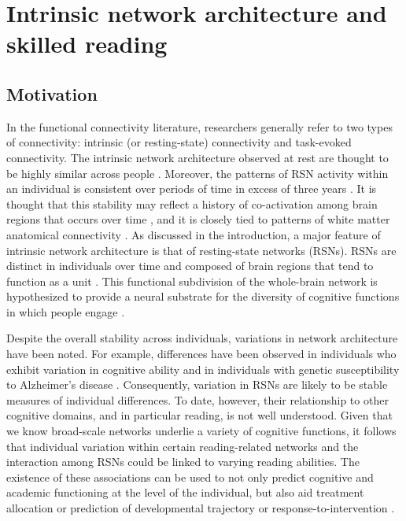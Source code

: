 \chapter{Intrinsic network architecture and skilled reading}

\section{Motivation}

In the functional connectivity literature, researchers generally refer to two types of connectivity: intrinsic (or resting-state) connectivity and task-evoked connectivity. The intrinsic network architecture observed at rest are thought to be highly similar across people \citep{Damoiseaux2006}. Moreover, the patterns of RSN activity within an individual is consistent over periods of time in excess of three years \citep{Choe2015}. It is thought that this stability may reflect a history of co-activation among brain regions that occurs over time \citep{Power2010}, and it is closely tied to patterns of white matter anatomical connectivity \citep{Honey2009}. As discussed in the introduction, a major feature of intrinsic network architecture is that of resting-state networks (RSNs). RSNs are distinct in individuals over time and composed of brain regions that tend to function as a unit \citep{DeLuca2006, Smith2009}. This functional subdivision of the whole-brain network is hypothesized to provide a neural substrate for the diversity of cognitive functions in which people engage \citep{Yeo2014}.

Despite the overall stability across individuals, variations in network architecture have been noted. For example, differences have been observed in individuals who exhibit variation in cognitive ability \citep{Reineberg2015, Jiang2013} and in individuals with genetic susceptibility to Alzheimer’s disease \citep{Trachtenberg2012}. Consequently, variation in RSNs are likely to be stable measures of individual differences. To date, however, their relationship to other cognitive domains, and in particular reading, is not well understood.  Given that we know broad-scale networks underlie a variety of cognitive functions, it follows that individual variation within certain reading-related networks and the interaction among RSNs could be linked to varying reading abilities. The existence of these associations can be used to not only predict cognitive and academic functioning at the level of the individual, but also aid treatment allocation or prediction of developmental trajectory \citep{Mattfeld2014} or response-to-intervention \citep{Crowther2015, Whitfield-Gabrieli2016}. 

